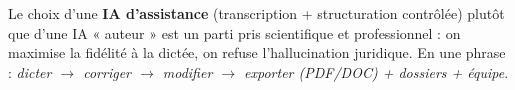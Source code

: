 Le choix d'une \textbf{IA d'assistance} (transcription + structuration contrôlée) plutôt que d'une IA « auteur » est un parti pris scientifique et professionnel : on maximise la fidélité à la dictée, on refuse l'hallucination juridique. En une phrase : \emph{dicter $\rightarrow$ corriger $\rightarrow$ modifier $\rightarrow$ exporter (PDF/DOC) + dossiers + équipe}.
